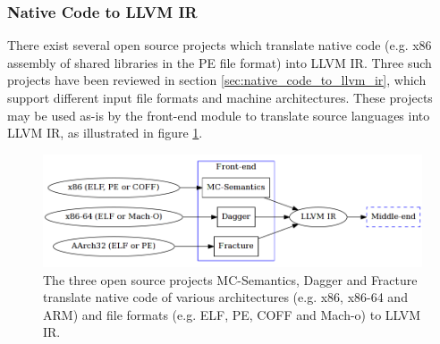 
\subsubsection{Native Code to LLVM IR}
\label{sec:design_native_code_to_llvm_ir}

There exist several open source projects which translate native code (e.g. x86 assembly of shared libraries in the PE file format) into LLVM IR. Three such projects have been reviewed in section \ref{sec:native_code_to_llvm_ir}, which support different input file formats and machine architectures. These projects may be used as-is by the front-end module to translate source languages into LLVM IR, as illustrated in figure \ref{fig:front-end_binary}.

\begin{figure}[htbp]
	\begin{center}
		\includegraphics[width=\textwidth]{inc/front-end_binary.png}
		\caption{The three open source projects MC-Semantics, Dagger and Fracture translate native code of various architectures (e.g. x86, x86-64 and ARM) and file formats (e.g. ELF, PE, COFF and Mach-o) to LLVM IR.}
		\label{fig:front-end_binary}
	\end{center}
\end{figure}
